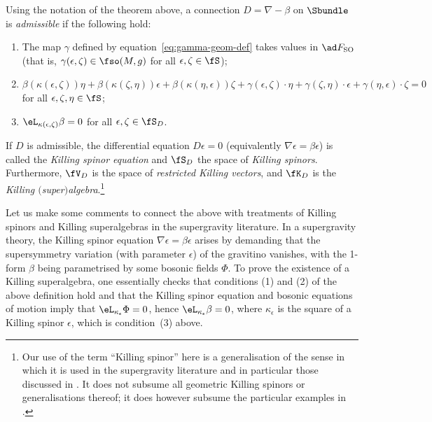 \begin{Definition}\label{def:killing-spinor}
	Using the notation of the theorem above, a connection $D=\nabla-\beta$ on $\Sbundle$ is \emph{admissible} if the following hold:
	\begin{enumerate}\itemsep=0pt
		\item The map $\gamma$ defined by equation~\eqref{eq:gamma-geom-def} takes values in $\ad F_{\rm SO}$ (that is, $\gamma(\epsilon,\zeta)\in\fso(M,g)$ for all $\epsilon,\zeta\in\fS$); %

		\item $
\beta(\kappa(\epsilon,\zeta))\eta + \beta(\kappa(\zeta,\eta))\epsilon + \beta(\kappa(\eta,\epsilon))\zeta
				+ \gamma(\epsilon,\zeta)\cdot\eta + \gamma(\zeta,\eta)\cdot\epsilon +\gamma(\eta,\epsilon)\cdot\zeta
				= 0$ for all $\epsilon,\zeta,\eta\in\fS$; %

		\item $\eL_{\kappa(\epsilon,\zeta)}\beta = 0$ for all $\epsilon,\zeta\in\fS_D$. %
	\end{enumerate}
	If $D$ is admissible, the differential equation $D\epsilon=0$ (equivalently $\nabla\epsilon =\beta\epsilon$) is called the \emph{Killing spinor equation} and $\fS_D$ the space of \emph{Killing spinors}. Furthermore, $\fV_D$ is the space of \emph{restricted Killing vectors}, and $\fK_D$ is the \emph{Killing $($super$)$algebra}.\footnote{Our use of the term ``Killing spinor'' here is a generalisation of the sense in which it is used in the supergravity literature and in particular those discussed in \cite{Beckett2021,deMedeiros2016,deMedeiros2018,Figueroa-OFarrill2017_1,Figueroa-OFarrill2017}. It does not subsume all geometric Killing spinors or generalisations thereof; it does however subsume the particular examples in \cite{Figueroa-OFarrill2008_except}.}
\end{Definition}

Let us make some comments to connect the above with treatments of Killing spinors and Killing superalgebras in the supergravity literature. In a supergravity theory, the Killing spinor equation $\nabla\epsilon=\beta\epsilon$ arises by demanding that the supersymmetry variation (with parameter $\epsilon$) of the gravitino vanishes, with the 1-form $\beta$ being parametrised by some bosonic fields $\Phi$. To prove the existence of a Killing superalgebra, one essentially checks that conditions (1) and (2) of the above definition hold and that the Killing spinor equation and bosonic equations of motion imply that $\eL_{\kappa_\epsilon}\Phi=0$, hence $\eL_{\kappa_\epsilon}\beta=0$, where $\kappa_\epsilon$ is the square of a Killing spinor $\epsilon$, which is condition~(3) above.

